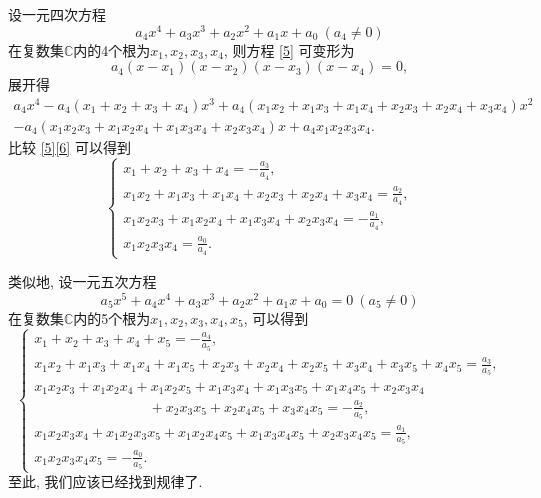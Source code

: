 \documentclass[12pt,a4paper]{ctexart}
\begin{document}
设一元四次方程
\begin{equation}
    a_4x^4 + a_3x^3 + a_2x^2 + a_1x + a_0\ (a_4 \neq 0)
    \label{5}
\end{equation}
在复数集$\mathbb{C}$内的4个根为$x_1, x_2, x_3, x_4$, 则方程 \eqref{5}
可变形为
$$a_4(x - x_1)(x - x_2)(x - x_3)(x - x_4) = 0,$$
展开得
\begin{equation}
    \begin{split}
        a_4x^4 - a_4(x_1 + x_2 + x_3 + x_4)x^3 + a_4(x_1x_2 + x_1x_3 + x_1x_4 + x_2x_3 + x_2x_4 + x_3x_4)x^2 \\- a_4(x_1x_2x_3 + x_1x_2x_4 + x_1x_3x_4 + x_2x_3x_4)x + a_4x_1x_2x_3x_4.
        \label{6}
    \end{split}
\end{equation}
比较 \eqref{5}\eqref{6} 可以得到
\setlength{\abovedisplayskip}{10pt}
\setlength{\belowdisplayskip}{10pt}
$$\begin{cases*}
        x_1 + x_2 + x_3 + x_4 = -\displaystyle\frac{a_3}{a_4},                              \\
        x_1x_2 + x_1x_3 + x_1x_4 + x_2x_3 + x_2x_4 + x_3x_4 = \displaystyle\frac{a_2}{a_4}, \\
        x_1x_2x_3 + x_1x_2x_4 + x_1x_3x_4 + x_2x_3x_4 = -\displaystyle\frac{a_1}{a_4},      \\
        x_1x_2x_3x_4 = \displaystyle\frac{a_0}{a_4}.
    \end{cases*}$$

类似地, 设一元五次方程
\setlength{\abovedisplayskip}{3pt}
\setlength{\belowdisplayskip}{3pt}
$$a_5x^5 + a_4x^4 + a_3x^3 + a_2x^2 + a_1x + a_0 = 0\ (a_5 \neq 0)$$
在复数集$\mathbb{C}$内的5个根为$x_1, x_2, x_3, x_4, x_5$, 可以得到
\setlength{\abovedisplayskip}{10pt}
\setlength{\belowdisplayskip}{10pt}
$$\begin{cases*}
        x_1 + x_2 + x_3 + x_4 + x_5 = -\displaystyle\frac{a_4}{a_5},                                                                                   \\
        x_1x_2 + x_1x_3 + x_1x_4 + x_1x_5 + x_2x_3 + x_2x_4 + x_2x_5 + x_3x_4 + x_3x_5 + x_4x_5 = \displaystyle\frac{a_3}{a_5},                        \\
        x_1x_2x_3 + x_1x_2x_4 + x_1x_2x_5 + x_1x_3x_4 + x_1x_3x_5 + x_1x_4x_5 + x_2x_3x_4                                                              \\
        \ \ \ \ \ \ \ \ \ \ \ \ \ \ \ \ \ \ \ \ \ \ \ \ \ \ \ \ \ \ \ \ \ \ \ \ \ + x_2x_3x_5 + x_2x_4x_5 + x_3x_4x_5 = -\displaystyle\frac{a_2}{a_5}, \\
        x_1x_2x_3x_4 + x_1x_2x_3x_5 + x_1x_2x_4x_5 + x_1x_3x_4x_5 + x_2x_3x_4x_5 = \displaystyle\frac{a_1}{a_5},                                       \\
        x_1x_2x_3x_4x_5 = -\displaystyle\frac{a_0}{a_5}.
    \end{cases*}$$
至此, 我们应该已经找到规律了.
\setlength{\abovedisplayskip}{3pt}
\setlength{\belowdisplayskip}{3pt}
\end{document}
